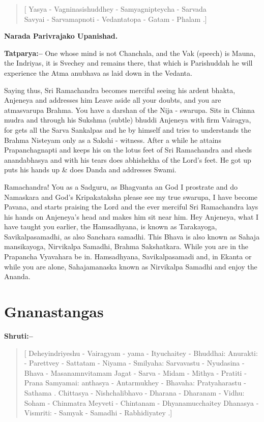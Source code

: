 \begin{verse}
[ Yasya - Vagninasishuddhey - Samyagnipteycha - Sarvada \\ Savyai - Sarvamapnoti - Vedantatopa - Gatam - Phalam .]
\end{verse}

\begin{flushright}
\textbf{Narada Parivrajako Upanishad.}
\end{flushright}

\textbf{Tatparya:–} One whose mind is not Chanchala, and the Vak (speech) is Mauna, the Indriyas, it is Svechey and remains there, that which is Parishuddah he will experience the Atma anubhava as laid down in the Vedanta.

Saying thus, Sri Ramachandra becomes merciful seeing his ardent bhakta, Anjeneya and addresses him Leave aside all your doubts, and you are atmasvarupa Brahma. You have a darshan of the Nija - swarupa. Sits in Chinna mudra and through his Sukshma (subtle) bhuddi Anjeneya with firm Vairagya, for gets all the Sarva Sankalpas and he by himself and tries to understands the Brahma Nisteyam only as a Sakshi - witness. After a while he attains Prapanchagnapti and keeps his on the lotus feet of Sri Ramachandra and sheds anandabhasya and with his tears does abhishekha of the Lord's feet. He got up puts his hands up \& does Danda and addresses Swami.

Ramachandra! You as a Sadguru, as Bhagvanta an God I prostrate and do Namaskara and God's Kripakataksha please see my true swarupa, I have become Pavana, and starts praising the Lord and the ever merciful Sri Ramachandra lays his hands on Anjeneya's head and makes him sit near him. Hey Anjeneya, what I have taught you earlier, the Hamsadhyana, is known as Tarakayoga, Savikalpasamadhi, as also Sanchara samadhi. This Bhava is also known as Sahaja mansikayoga, Nirvikalpa Samadhi, Brahma Sakshatkara. While you are in the Prapancha Vyavahara be in. Hamsadhyana, Savikalpasamadi and, in Ekanta or while you are alone, Sahajamanaska known as Nirvikalpa Samadhi and enjoy the Ananda.

\chapter{Gnanastangas}

\textbf{Shruti:–}

\begin{verse}
[ Deheyindriyeshu - Vairagyam - yama - Ityuchaitey - Bhuddhai:  Anurakti: - Parettvey - Sattatam - Niyama - Smilyaha:  Sarvavastu - Nyudasina - Bhava - Masanamnvitamam  Jagat - Sarva - Midam - Mithya - Pratiti - Prana Samyamai:  anthasya - Antarmukhey - Bhavaha: Pratyaharastu - Sathama . Chittasya - Nishchalibhavo - Dharana - Dharanam - Vidhu:  Soham - Chinmatra Meyveti - Chintanam - Dhyanamucchaitey Dhanasya - Vismriti: - Samyak - Samadhi - Rabhidiyatey .]
\end{verse}

